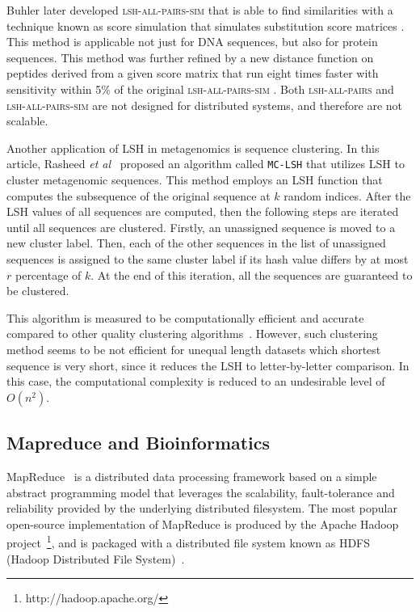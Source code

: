 \documentclass[titlepage]{csetr}
\begin{document}
Buhler later developed \textsc{lsh-all-pairs-sim} that is able to find similarities with a technique known as score simulation that simulates substitution score matrices \cite{LSH-ALL-PAIRS-SIM}. This method is applicable not just for DNA sequences, but also for protein sequences. This method was further refined by a new distance function on peptides derived from a given score matrix that run eight times faster with sensitivity within 5\% of the original \textsc{lsh-all-pairs-sim} \cite{LSH-ALL-PAIRS-SIM2}. Both \textsc{lsh-all-pairs} and \textsc{lsh-all-pairs-sim} are not designed for distributed systems, and therefore are not scalable.


Another application of LSH in metagenomics is sequence clustering. In this article, Rasheed \emph{et al}~\cite{EfficientMetagenomicsClusteringLSH} proposed an algorithm called \texttt{MC-LSH} that utilizes LSH to cluster metagenomic sequences. This method employs an LSH function that computes the subsequence of the original sequence at $k$ random indices. After the LSH values of all sequences are computed, then the following steps are iterated until all sequences are clustered. Firstly, an unassigned sequence is moved to a new cluster label. Then, each of the other sequences in the list of unassigned sequences is assigned to the same cluster label if its hash value differs by at most $r$ percentage of $k$. At the end of this iteration, all the sequences are guaranteed to be clustered. 

This algorithm is measured to be computationally efficient and accurate compared to other quality clustering algorithms~\cite{EfficientMetagenomicsClusteringLSH}. However, such clustering method seems to be not efficient for unequal length datasets which shortest sequence is very short, since it reduces the LSH to letter-by-letter comparison. In this case, the computational complexity is reduced to an undesirable level of $O(n^2)$.

\subsection{Mapreduce and Bioinformatics}


MapReduce~\cite{MapReduce} is a distributed data processing framework based on a simple abstract programming model that leverages the scalability, fault-tolerance and reliability provided by the underlying distributed filesystem. The most popular open-source implementation of MapReduce is produced by the Apache Hadoop project~\footnote{http://hadoop.apache.org/}, and is packaged with a distributed file system known as HDFS (Hadoop Distributed File System)~\cite{HDFS}.
\end{document}
